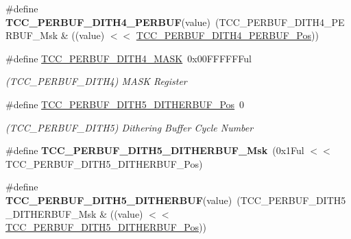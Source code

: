 \begin{DoxyCompactItemize}
\item 
\hypertarget{group___s_a_m_l21___t_c_c_gabc8e18a8676158e940d052f4ad3ea273}{}\#define {\bfseries T\+C\+C\+\_\+\+P\+E\+R\+B\+U\+F\+\_\+\+D\+I\+T\+H4\+\_\+\+P\+E\+R\+B\+U\+F}(value)~(T\+C\+C\+\_\+\+P\+E\+R\+B\+U\+F\+\_\+\+D\+I\+T\+H4\+\_\+\+P\+E\+R\+B\+U\+F\+\_\+\+Msk \& ((value) $<$$<$ \hyperlink{group___s_a_m_l21___t_c_c_ga04002d2414ad4d56431fbb9b833d8cca}{T\+C\+C\+\_\+\+P\+E\+R\+B\+U\+F\+\_\+\+D\+I\+T\+H4\+\_\+\+P\+E\+R\+B\+U\+F\+\_\+\+Pos}))\label{group___s_a_m_l21___t_c_c_gabc8e18a8676158e940d052f4ad3ea273}

\item 
\hypertarget{group___s_a_m_l21___t_c_c_gae7a129df2da0c4ab5452f5aab7a5edf8}{}\#define \hyperlink{group___s_a_m_l21___t_c_c_gae7a129df2da0c4ab5452f5aab7a5edf8}{T\+C\+C\+\_\+\+P\+E\+R\+B\+U\+F\+\_\+\+D\+I\+T\+H4\+\_\+\+M\+A\+S\+K}~0x00\+F\+F\+F\+F\+F\+Ful\label{group___s_a_m_l21___t_c_c_gae7a129df2da0c4ab5452f5aab7a5edf8}

\begin{DoxyCompactList}\small\item\em (T\+C\+C\+\_\+\+P\+E\+R\+B\+U\+F\+\_\+\+D\+I\+T\+H4) M\+A\+S\+K Register \end{DoxyCompactList}\item 
\hypertarget{group___s_a_m_l21___t_c_c_ga72179453c8ae11b22a55468510f263a8}{}\#define \hyperlink{group___s_a_m_l21___t_c_c_ga72179453c8ae11b22a55468510f263a8}{T\+C\+C\+\_\+\+P\+E\+R\+B\+U\+F\+\_\+\+D\+I\+T\+H5\+\_\+\+D\+I\+T\+H\+E\+R\+B\+U\+F\+\_\+\+Pos}~0\label{group___s_a_m_l21___t_c_c_ga72179453c8ae11b22a55468510f263a8}

\begin{DoxyCompactList}\small\item\em (T\+C\+C\+\_\+\+P\+E\+R\+B\+U\+F\+\_\+\+D\+I\+T\+H5) Dithering Buffer Cycle Number \end{DoxyCompactList}\item 
\hypertarget{group___s_a_m_l21___t_c_c_gaaed41f3f3d20f170c36cd51e8b885d0e}{}\#define {\bfseries T\+C\+C\+\_\+\+P\+E\+R\+B\+U\+F\+\_\+\+D\+I\+T\+H5\+\_\+\+D\+I\+T\+H\+E\+R\+B\+U\+F\+\_\+\+Msk}~(0x1\+Ful $<$$<$ T\+C\+C\+\_\+\+P\+E\+R\+B\+U\+F\+\_\+\+D\+I\+T\+H5\+\_\+\+D\+I\+T\+H\+E\+R\+B\+U\+F\+\_\+\+Pos)\label{group___s_a_m_l21___t_c_c_gaaed41f3f3d20f170c36cd51e8b885d0e}

\item 
\hypertarget{group___s_a_m_l21___t_c_c_ga0700ad4163c54daf9407cd4b727ece5a}{}\#define {\bfseries T\+C\+C\+\_\+\+P\+E\+R\+B\+U\+F\+\_\+\+D\+I\+T\+H5\+\_\+\+D\+I\+T\+H\+E\+R\+B\+U\+F}(value)~(T\+C\+C\+\_\+\+P\+E\+R\+B\+U\+F\+\_\+\+D\+I\+T\+H5\+\_\+\+D\+I\+T\+H\+E\+R\+B\+U\+F\+\_\+\+Msk \& ((value) $<$$<$ \hyperlink{group___s_a_m_l21___t_c_c_ga72179453c8ae11b22a55468510f263a8}{T\+C\+C\+\_\+\+P\+E\+R\+B\+U\+F\+\_\+\+D\+I\+T\+H5\+\_\+\+D\+I\+T\+H\+E\+R\+B\+U\+F\+\_\+\+Pos}))\label{group___s_a_m_l21___t_c_c_ga0700ad4163c54daf9407cd4b727ece5a}


\end{DoxyCompactItemize}
